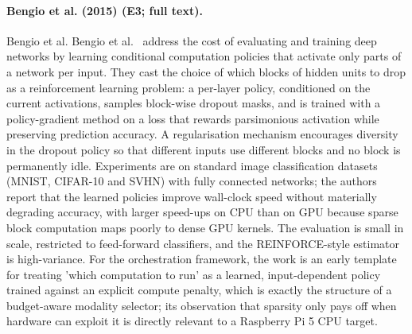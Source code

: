 \documentclass[10pt,a4paper]{article}
\begin{document}
\paragraph{Bengio et al. (2015) (E3; full text).} Bengio et al. Bengio et al.~\cite{Bengio2015} address the cost of evaluating and training deep networks by learning conditional computation policies that activate only parts of a network per input. They cast the choice of which blocks of hidden units to drop as a reinforcement learning problem: a per-layer policy, conditioned on the current activations, samples block-wise dropout masks, and is trained with a policy-gradient method on a loss that rewards parsimonious activation while preserving prediction accuracy. A regularisation mechanism encourages diversity in the dropout policy so that different inputs use different blocks and no block is permanently idle. Experiments are on standard image classification datasets (MNIST, CIFAR-10 and SVHN) with fully connected networks; the authors report that the learned policies improve wall-clock speed without materially degrading accuracy, with larger speed-ups on CPU than on GPU because sparse block computation maps poorly to dense GPU kernels. The evaluation is small in scale, restricted to feed-forward classifiers, and the REINFORCE-style estimator is high-variance. For the orchestration framework, the work is an early template for treating 'which computation to run' as a learned, input-dependent policy trained against an explicit compute penalty, which is exactly the structure of a budget-aware modality selector; its observation that sparsity only pays off when hardware can exploit it is directly relevant to a Raspberry Pi 5 CPU target.
\end{document}
